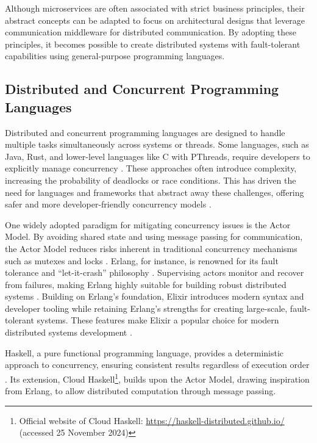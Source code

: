 Although microservices are often associated with strict business principles, their abstract concepts can be adapted to focus on architectural designs that leverage communication middleware for distributed communication. By adopting these principles, it becomes possible to create distributed systems with fault-tolerant capabilities using general-purpose programming languages.


\subsection{Distributed and Concurrent Programming Languages}

Distributed and concurrent programming languages are designed to handle multiple tasks simultaneously across systems or threads. Some languages, such as Java, Rust, and lower-level languages like C with PThreads, require developers to explicitly manage concurrency \cite{Valkov2018,Paduraru2018}. These approaches often introduce complexity, increasing the probability of deadlocks or race conditions. This has driven the need for languages and frameworks that abstract away these challenges, offering safer and more developer-friendly concurrency models \cite{Valkov2018}.

One widely adopted paradigm for mitigating concurrency issues is the Actor Model. By avoiding shared state and using message passing for communication, the Actor Model reduces risks inherent in traditional concurrency mechanisms such as mutexes and locks \cite{Valkov2018}. Erlang, for instance, is renowned for its fault tolerance and “let-it-crash” philosophy \cite{Armstrong2013}. Supervising actors monitor and recover from failures, making Erlang highly suitable for building robust distributed systems \cite{Armstrong2013}. Building on Erlang’s foundation, Elixir introduces modern syntax and developer tooling while retaining Erlang’s strengths for creating large-scale, fault-tolerant systems. These features make Elixir a popular choice for modern distributed systems development \cite{Juric2024}.

Haskell, a pure functional programming language, provides a deterministic approach to concurrency, ensuring consistent results regardless of execution order \cite{Valkov2018}. Its extension, Cloud Haskell\footnote{Official website of Cloud Haskell: \url{https://haskell-distributed.github.io/} (accessed 25 November 2024)}, builds upon the Actor Model, drawing inspiration from Erlang, to allow distributed computation through message passing.

